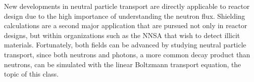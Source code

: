 \documentclass[11pt]{article}
\begin{document}
New developments in neutral particle transport are directly applicable to reactor design due to the high importance of understanding the neutron flux. Shielding calculations are a second major application that are pursued not only in reactor designs, but within organizations such as the NNSA that wish to detect illicit materials. Fortunately, both fields can be advanced by studying neutral particle transport, since both neutrons and photons, a more common decay product than neutrons, can be simulated with the linear Boltzmann transport equation, the topic of this class.
\end{document}
